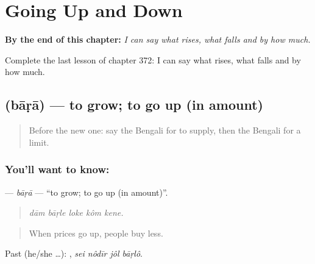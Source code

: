 
\chapter{Going Up and Down}
\label{ch:bn-going-up-and-down}

\begin{chapteropening}
\textbf{By the end of this chapter:} \emph{I can say what rises, what falls and by how much.}

Complete the last lesson of chapter 372: I can say what rises, what falls and by how much.
\end{chapteropening}

\section[\texorpdfstring{\bn{বাড়া} (bāṛā)}{বাড়া (bāṛā)}]{ (bāṛā) — to grow; to go up (in amount)}

\label{lesson:BN-C372-bara}



\begin{quote}
Before the new one: say the Bengali for to supply, then the Bengali for a limit.
\end{quote}

\subsection*{You'll want to know: }
\textbf{} — \emph{bāṛā} — \textquotedblleft{}to grow; to go up (in amount)\textquotedblright{}.

\begin{quote}
    
\end{quote}

\begin{quote}
\emph{dām bāṛle loke kôm kene.}
\end{quote}

\begin{quote}
When prices go up, people buy less.
\end{quote}

Past (he/she …):    , \emph{sei nôdīr jôl bāṛlô}.

